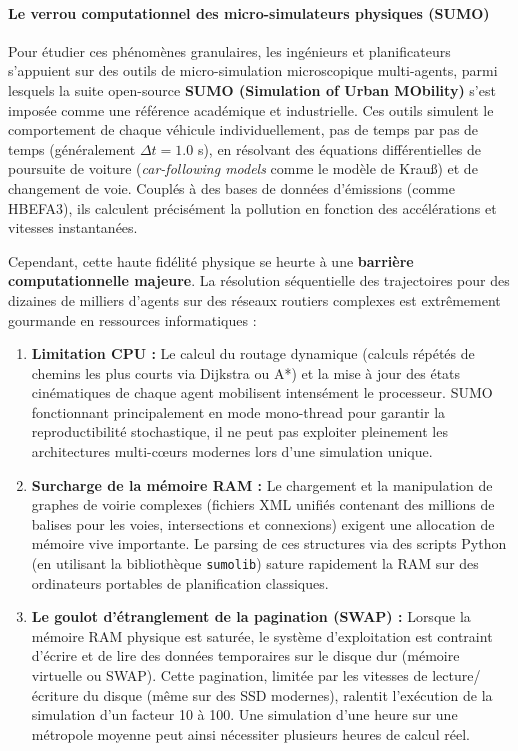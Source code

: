 \documentclass[10pt, a4paper]{article}
\providecommand{\tightlist}{}
\begin{document}
\paragraph{Le verrou computationnel des micro-simulateurs physiques
(SUMO)}\label{le-verrou-computationnel-des-micro-simulateurs-physiques-sumo}

Pour étudier ces phénomènes granulaires, les ingénieurs et
planificateurs s'appuient sur des outils de micro-simulation
microscopique multi-agents, parmi lesquels la suite open-source
\textbf{SUMO (Simulation of Urban MObility)} s'est imposée comme une
référence académique et industrielle. Ces outils simulent le
comportement de chaque véhicule individuellement, pas de temps par pas
de temps (généralement \(\Delta t = 1.0\) s), en résolvant des équations
différentielles de poursuite de voiture (\emph{car-following models}
comme le modèle de Krauß) et de changement de voie. Couplés à des bases
de données d'émissions (comme HBEFA3), ils calculent précisément la
pollution en fonction des accélérations et vitesses instantanées.

Cependant, cette haute fidélité physique se heurte à une
\textbf{barrière computationnelle majeure}. La résolution séquentielle
des trajectoires pour des dizaines de milliers d'agents sur des réseaux
routiers complexes est extrêmement gourmande en ressources informatiques
:

\begin{enumerate}
\def\labelenumi{\arabic{enumi}.}
\tightlist
\item
  \textbf{Limitation CPU :} Le calcul du routage dynamique (calculs
  répétés de chemins les plus courts via Dijkstra ou A*) et la mise à
  jour des états cinématiques de chaque agent mobilisent intensément le
  processeur. SUMO fonctionnant principalement en mode mono-thread pour
  garantir la reproductibilité stochastique, il ne peut pas exploiter
  pleinement les architectures multi-cœurs modernes lors d'une
  simulation unique.
\item
  \textbf{Surcharge de la mémoire RAM :} Le chargement et la
  manipulation de graphes de voirie complexes (fichiers XML unifiés
  contenant des millions de balises pour les voies, intersections et
  connexions) exigent une allocation de mémoire vive importante. Le
  parsing de ces structures via des scripts Python (en utilisant la
  bibliothèque \texttt{sumolib}) sature rapidement la RAM sur des
  ordinateurs portables de planification classiques.
\item
  \textbf{Le goulot d'étranglement de la pagination (SWAP) :} Lorsque la
  mémoire RAM physique est saturée, le système d'exploitation est
  contraint d'écrire et de lire des données temporaires sur le disque
  dur (mémoire virtuelle ou SWAP). Cette pagination, limitée par les
  vitesses de lecture/écriture du disque (même sur des SSD modernes),
  ralentit l'exécution de la simulation d'un facteur 10 à 100. Une
  simulation d'une heure sur une métropole moyenne peut ainsi nécessiter
  plusieurs heures de calcul réel.
\end{enumerate}
\end{document}
